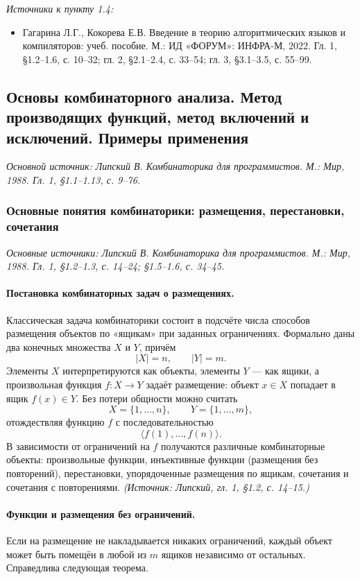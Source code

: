 \documentclass[a4paper,12pt]{article}
\begin{document}
\noindent\textit{Источники к пункту 1.4:}
\begin{itemize}
\item Гагарина Л.Г., Кокорева Е.В. Введение в теорию алгоритмических языков и компиляторов: учеб. пособие. М.: ИД «ФОРУМ»: ИНФРА-М, 2022. Гл. 1, §1.2--1.6, с. 10--32; гл. 2, §2.1--2.4, с. 33--54; гл. 3, §3.1--3.5, с. 55--99.
\end{itemize}

\subsection{Основы комбинаторного анализа. Метод производящих функций, метод включений и исключений. Примеры применения}

\noindent\textit{Основной источник: Липский В. Комбинаторика для программистов. М.: Мир, 1988. Гл. 1, §1.1--1.13, с. 9--76.}

\subsubsection{Основные понятия комбинаторики: размещения, перестановки, сочетания}

\noindent\textit{Основные источники: Липский В. Комбинаторика для программистов. М.: Мир, 1988. Гл. 1, §1.2--1.3, с. 14--24; §1.5--1.6, с. 34--45.}

\paragraph{Постановка комбинаторных задач о размещениях.}
Классическая задача комбинаторики состоит в подсчёте числа способов размещения объектов по «ящикам» при заданных ограничениях. Формально даны два конечных множества \(X\) и \(Y\), причём
\[
|X|=n,\qquad |Y|=m.
\]
Элементы \(X\) интерпретируются как объекты, элементы \(Y\) --- как ящики, а произвольная функция \(f:X\to Y\) задаёт размещение: объект \(x\in X\) попадает в ящик \(f(x)\in Y\). Без потери общности можно считать
\[
X=\{1,\dots,n\},\qquad Y=\{1,\dots,m\},
\]
отождествляя функцию \(f\) с последовательностью
\[
\langle f(1),\dots,f(n)\rangle.
\]
В зависимости от ограничений на \(f\) получаются различные комбинаторные объекты: произвольные функции, инъективные функции (размещения без повторений), перестановки, упорядоченные размещения по ящикам, сочетания и сочетания с повторениями.
\textit{(Источник: Липский, гл. 1, §1.2, с. 14--15.)}

\paragraph{Функции и размещения без ограничений.}
Если на размещение не накладывается никаких ограничений, каждый объект может быть помещён в любой из \(m\) ящиков независимо от остальных. Справедлива следующая теорема.
\end{document}
